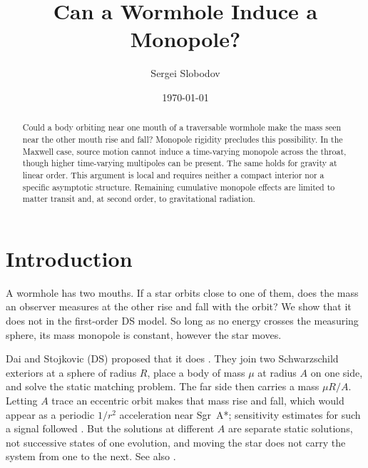 \documentclass[aps,prd,10pt,onecolumn,nofootinbib,superscriptaddress,floatfix]{revtex4-2}
\begin{document}
\raggedbottom

\title{Can a Wormhole Induce a Monopole?}

\author{Sergei Slobodov}
\noaffiliation

\date{\today}

\begin{abstract}
Could a body orbiting near one mouth of a traversable wormhole make the mass
seen near the other mouth rise and fall?  Monopole rigidity precludes this possibility.  In the Maxwell case, source motion cannot induce a time-varying monopole across the throat, though higher time-varying multipoles can be present.  The same holds for gravity at linear order.  This argument is local and requires neither a compact interior nor a specific asymptotic structure.  Remaining cumulative monopole effects are limited to matter transit and, at second order, to gravitational radiation.
\end{abstract}

\maketitle

\section{Introduction}
\label{sec:introduction}

A wormhole has two mouths.  If a star orbits close to one of them, does the
mass an observer measures at the other rise and fall with the orbit?  We show
that it does not in the first-order DS model.  So long as no energy crosses the
measuring sphere, its mass monopole is constant, however the star moves.

Dai and Stojkovic (DS) proposed that it does
\cite{DaiStojkovic2019Observing}.  They join two Schwarzschild exteriors at a
sphere of radius $R$, place a body of mass $\mu$ at radius $A$ on one side, and
solve the static matching problem.  The far side then carries a mass $\mu R/A$.
Letting $A$ trace an eccentric orbit makes that mass rise and fall, which would
appear as a periodic $1/r^2$ acceleration near Sgr~A*; sensitivity estimates
for such a signal followed \cite{SimonettiEtAl2021SensitiveSearches}.  But the
solutions at different $A$ are separate static
solutions, not successive states of one evolution, and moving the star does not
carry the system from one to the next.  See also
\cite{Krasnikov2020CommentObserving,DaiStojkovic2020ReplyObserving}.
\end{document}
